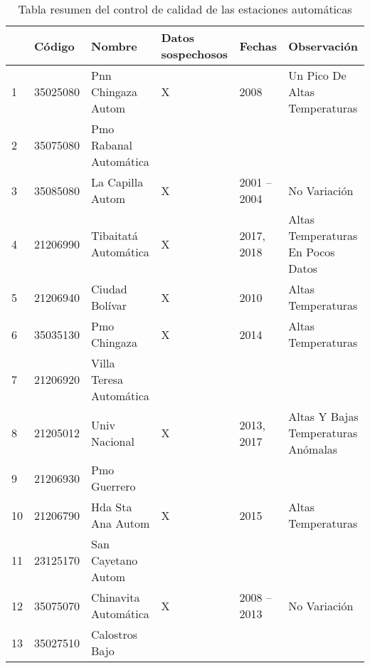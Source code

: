 \begin{table}[H]

\caption{Tabla resumen del control de calidad de las estaciones automáticas}
\label{tab:res_tab_autom}
\begin{tabular}{lllp{2cm}lp{3cm}}
   & Código   & Nombre                  & Datos sospechosos & Fechas      & Observación                                 \\ \hline
1  & 35025080 & Pnn Chingaza Autom      & X                 & 2008        & Un Pico De Altas Temperaturas               \\ \hline
2  & 35075080 & Pmo Rabanal Automática  &                   &             &                                             \\ \hline
3  & 35085080 & La Capilla Autom        & X                 & 2001 – 2004 & No Variación                                \\ \hline
4  & 21206990 & Tibaitatá Automática    & X                 & 2017, 2018  & Altas Temperaturas En Pocos Datos           \\ \hline
5  & 21206940 & Ciudad Bolívar          & X                 & 2010        & Altas Temperaturas                          \\ \hline
6  & 35035130 & Pmo Chingaza            & X                 & 2014        & Altas Temperaturas                          \\ \hline
7  & 21206920 & Villa Teresa Automática &                   &             &                                             \\ \hline
8  & 21205012 & Univ Nacional           & X                 & 2013, 2017  & Altas Y Bajas Temperaturas Anómalas         \\ \hline
9  & 21206930 & Pmo Guerrero            &                   &             &                                             \\ \hline
10 & 21206790 & Hda Sta Ana Autom       & X                 & 2015        & Altas Temperaturas                          \\ \hline
11 & 23125170 & San Cayetano Autom      &                   &             &                                             \\ \hline
12 & 35075070 & Chinavita Automática    & X                 & 2008 – 2013 & No Variación                                \\ \hline
13 & 35027510 & Calostros Bajo          &                   &             &                                             \\ \hline

\end{tabular}
\end{table}
